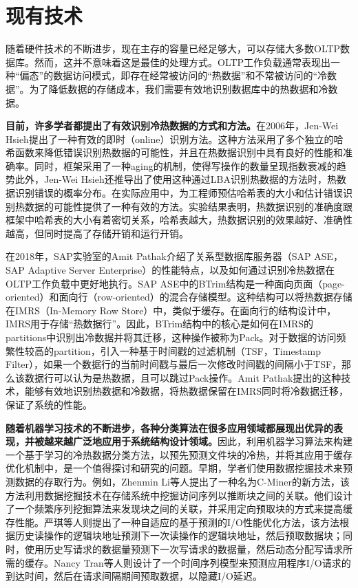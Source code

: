 \documentclass{article}
\begin{document}
\section{现有技术}

随着硬件技术的不断进步，现在主存的容量已经足够大，可以存储大多数OLTP数据库。然而，这并不意味着这是最佳的处理方式。OLTP工作负载通常表现出一种“偏态”的数据访问模式，即存在经常被访问的“热数据”和不常被访问的“冷数据”。为了降低数据的存储成本，我们需要有效地识别数据库中的热数据和冷数据。

\textbf{目前，许多学者都提出了有效识别冷热数据的方式和方法。}在2006年，Jen-Wei Hsieh提出了一种有效的即时（online）识别方法。这种方法采用了多个独立的哈希函数来降低错误识别热数据的可能性，并且在热数据识别中具有良好的性能和准确率\textsuperscript{\cite{4}}。同时，框架采用了一种aging的机制，使得写操作的数量呈现指数衰减的趋势此外，Jen-Wei Hsieh还推导出了使用这种通过LBA识别热数据的方法时，热数据识别错误的概率分布。在实际应用中，为工程师预估哈希表的大小和估计错误识别热数据的可能性提供了一种有效的方法。实验结果表明，热数据识别的准确度跟框架中哈希表的大小有着密切关系，哈希表越大，热数据识别的效果越好、准确性越高，但同时提高了存储开销和运行开销。

在2018年，SAP实验室的Amit Pathak介绍了关系型数据库服务器（SAP ASE，SAP Adaptive Server Enterprise）的性能特点，以及如何通过识别冷热数据在OLTP工作负载中更好地执行。\textsuperscript{\cite{5}}SAP ASE中的BTrim结构是一种面向页面（page-oriented）和面向行（row-oriented）的混合存储模型。这种结构可以将热数据存储在IMRS（In-Memory Row Store）中，类似于缓存。在面向行的结构设计中，IMRS用于存储“热数据行”。因此，BTrim结构中的核心是如何在IMRS的partitions中识别出冷数据并将其迁移，这种操作被称为Pack。对于数据的访问频繁性较高的partition，引入一种基于时间戳的过滤机制（TSF，Timestamp Filter），如果一个数据行的当前时间戳与最后一次修改时间戳的间隔小于TSF，那么该数据行可以认为是热数据，且可以跳过Pack操作。Amit Pathak提出的这种技术，能够有效地识别热数据和冷数据，将热数据保留在IMRS同时将冷数据迁移，保证了系统的性能。

\textbf{随着机器学习技术的不断进步，各种分类算法在很多应用领域都展现出优异的表现，并被越来越广泛地应用于系统结构设计领域。}因此，利用机器学习算法来构建一个基于学习的冷热数据分类方法，以预先预测文件块的冷热，并将其应用于缓存优化机制中，是一个值得探讨和研究的问题。早期，学者们使用数据挖掘技术来预测数据的存取行为。例如，Zhenmin Li\textsuperscript{\cite{6}}等人提出了一种名为C-Miner的新方法，该方法利用数据挖掘技术在存储系统中挖掘访问序列以推断块之间的关联。他们设计了一个频繁序列挖掘算法来发现块之间的关联，并采用定向预取块的方式来提高缓存性能。严琪等人则提出了一种自适应的基于预测的I/O性能优化方法，该方法根据历史读操作的逻辑块地址预测下一次读操作的逻辑块地址，然后预取数据块；同时，使用历史写请求的数据量预测下一次写请求的数据量，然后动态分配写请求所需的缓存。Nancy Tran\textsuperscript{\cite{7}}等人则设计了一个时间序列模型来预测应用程序I/O请求的到达时间，然后在请求间隔期间预取数据，以隐藏I/O延迟。
\end{document}
